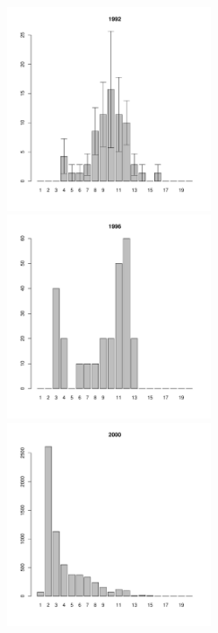 \begin{figure}[h]

\begin{multicols}{3}
\hfill
\includegraphics[width=60mm]{../White_Sea/Luvenga_Goreliy/high_1992_.pdf}
\hfill
\includegraphics[width=60mm]{../White_Sea/Luvenga_Goreliy/high_1996_.pdf}
\hfill
\includegraphics[width=60mm]{../White_Sea/Luvenga_Goreliy/high_2000_.pdf}
\end{multicols}




\end{figure}
